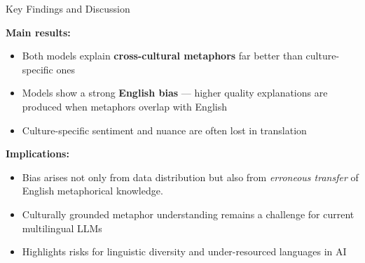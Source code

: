 \documentclass[dvipsnames]{beamer}
\begin{document}
\begin{frame}{Key Findings and Discussion}

\textbf{Main results:}
\begin{itemize}
  \item Both models explain \textbf{cross-cultural metaphors} far better than culture-specific ones
  \item Models show a strong \textbf{English bias} — higher quality explanations are produced when metaphors overlap with English
  \item Culture-specific sentiment and nuance are often lost in translation
\end{itemize}

\medskip
\textbf{Implications:}
\begin{itemize}
  \item Bias arises not only from data distribution but also from \emph{erroneous transfer} of English metaphorical knowledge. 
  \item Culturally grounded metaphor understanding remains a challenge for current multilingual LLMs
  \item Highlights risks for linguistic diversity and under-resourced languages in AI
\end{itemize}

\end{frame}
\end{document}
